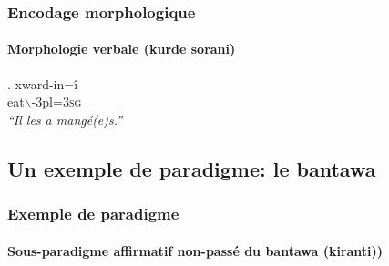 \begin{frame}
\frametitle{Encodage morphologique}
\framesubtitle{Morphologie verbale (kurde sorani)}

\ex. xward-in\alert{=î} \\
eat$\backslash$\sii-{\sc 3pl}=\textsc{3sg}\\
{\em ``Il les a mangé(e)s.''}

\end{frame}

\subsection[Bantawa]{Un exemple de paradigme: le bantawa}


\begin{frame}
\frametitle{Exemple de paradigme}
\framesubtitle{Sous-paradigme affirmatif non-passé du bantawa (kiranti))}


\end{frame}